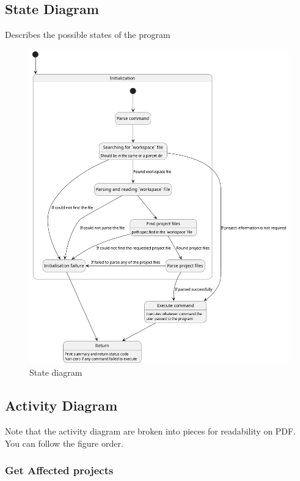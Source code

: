\documentclass[11pt]{article}
\begin{document}
\subsection{State Diagram}
Describes the possible states of the program

\begin{figure}[htbp]
  \centering
  \includegraphics[width=0.5\textheight]{diags/state.png}
  \caption{\label{fig:state}State diagram}
\end{figure}

\newpage
\subsection{Activity Diagram}

Note that the activity diagram are broken into pieces for readability on PDF.
You can follow the figure order.

\subsubsection{Get Affected projects}
\end{document}
